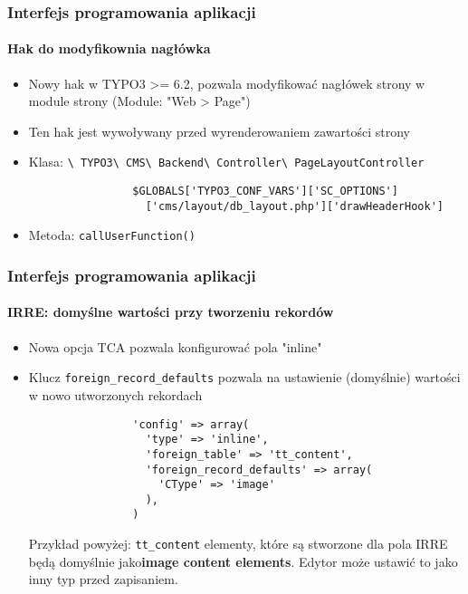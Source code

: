 \begin{frame}[fragile]
	\frametitle{Interfejs programowania aplikacji}
	\framesubtitle{Hak do modyfikownia nagłówka}

	\begin{itemize}
		\item Nowy hak w TYPO3 >= 6.2, pozwala modyfikować nagłówek strony w module strony (Module: "Web > Page")
		\item Ten hak jest wywoływany przed wyrenderowaniem zawartości strony
		\item Klasa:\newline
			\smaller
				\texttt{\textbackslash
					TYPO3\textbackslash
					CMS\textbackslash
					Backend\textbackslash
					Controller\textbackslash
					PageLayoutController}\normalsize

			\lstset{
				basicstyle=\smaller\ttfamily
			}

			\begin{lstlisting}
				$GLOBALS['TYPO3_CONF_VARS']['SC_OPTIONS']
				  ['cms/layout/db_layout.php']['drawHeaderHook']
			\end{lstlisting}

		\item Metoda:\newline
			\smaller
				\texttt{callUserFunction()}

	\end{itemize}

\end{frame}


\begin{frame}[fragile]
	\frametitle{Interfejs programowania aplikacji}
	\framesubtitle{IRRE: domyślne wartości przy tworzeniu rekordów}

	\begin{itemize}
		\item Nowa opcja TCA pozwala konfigurować pola "inline"
		\item Klucz \texttt{foreign\_record\_defaults} pozwala na ustawienie (domyślnie) wartości w nowo utworzonych rekordach

			\begin{lstlisting}
				'config' => array(
				  'type' => 'inline',
				  'foreign_table' => 'tt_content',
				  'foreign_record_defaults' => array(
				    'CType' => 'image'
				  ),
				)
			\end{lstlisting}

			\small
				Przykład powyżej: \texttt{tt\_content} elementy, które są stworzone dla pola IRRE będą domyślnie jako\textbf{image content elements}. Edytor może ustawić to jako inny typ przed zapisaniem.
			\normalsize
	\end{itemize}

\end{frame}

